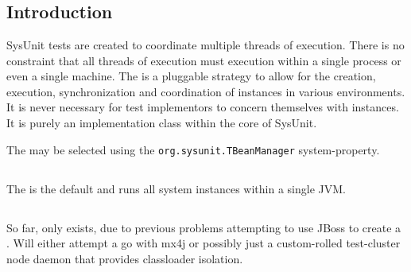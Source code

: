 \chapter{}

\section{Introduction}

SysUnit tests are created to coordinate multiple threads of
execution.  There is no constraint that all threads of execution
must execution within a single process or even a single machine.
The  is a pluggable strategy to allow for
the creation, execution, synchronization and coordination of 
 instances in various environments.  It is
never necessary for test implementors to concern themselves
with  instances.  It is purely an implementation
class within the core of SysUnit. 

The  may be selected using the 
\texttt{org.sysunit.TBeanManager} system-property.

\section{}

The  is the default 
and runs all system  instances within a single JVM.

\section{}



\begin{implnote}
So far, only  exists, due to previous
problems attempting to use JBoss to create a
.  Will either attempt a go with
mx4j or possibly just a custom-rolled test-cluster node daemon
that provides classloader isolation.
\end{implnote}
